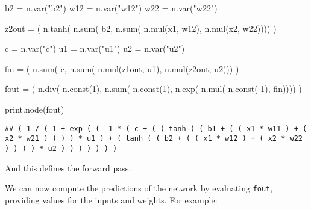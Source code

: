 \documentclass[
  a4paper,
]{article}
\newenvironment{Shaded}{\begin{snugshade}}{\end{snugshade}}
\newcommand{\DecValTok}[1]{\textcolor[rgb]{0.00,0.00,0.81}{#1}}
\newcommand{\FunctionTok}[1]{\textcolor[rgb]{0.00,0.00,0.00}{#1}}
\newcommand{\NormalTok}[1]{#1}
\newcommand{\OtherTok}[1]{\textcolor[rgb]{0.56,0.35,0.01}{#1}}
\newcommand{\SpecialCharTok}[1]{\textcolor[rgb]{0.00,0.00,0.00}{#1}}
\newcommand{\StringTok}[1]{\textcolor[rgb]{0.31,0.60,0.02}{#1}}
\begin{document}
\begin{Shaded}
\begin{Highlighting}[]
\NormalTok{b2 }\OtherTok{=} \FunctionTok{n.var}\NormalTok{(}\StringTok{"b2"}\NormalTok{)}
\NormalTok{w12 }\OtherTok{=} \FunctionTok{n.var}\NormalTok{(}\StringTok{"w12"}\NormalTok{)}
\NormalTok{w22 }\OtherTok{=} \FunctionTok{n.var}\NormalTok{(}\StringTok{"w22"}\NormalTok{)}

\NormalTok{z2out }\OtherTok{=}\NormalTok{ (}
  \FunctionTok{n.tanh}\NormalTok{(}
    \FunctionTok{n.sum}\NormalTok{(}
\NormalTok{      b2,}
      \FunctionTok{n.sum}\NormalTok{(}
         \FunctionTok{n.mul}\NormalTok{(x1, w12),}
         \FunctionTok{n.mul}\NormalTok{(x2, w22))))}
\NormalTok{)}

\NormalTok{c }\OtherTok{=} \FunctionTok{n.var}\NormalTok{(}\StringTok{"c"}\NormalTok{)}
\NormalTok{u1 }\OtherTok{=} \FunctionTok{n.var}\NormalTok{(}\StringTok{"u1"}\NormalTok{)}
\NormalTok{u2 }\OtherTok{=} \FunctionTok{n.var}\NormalTok{(}\StringTok{"u2"}\NormalTok{)}

\NormalTok{fin }\OtherTok{=}\NormalTok{ (}
  \FunctionTok{n.sum}\NormalTok{(}
\NormalTok{    c,}
    \FunctionTok{n.sum}\NormalTok{(}
      \FunctionTok{n.mul}\NormalTok{(z1out, u1),}
      \FunctionTok{n.mul}\NormalTok{(z2out, u2)))}
\NormalTok{)}

\NormalTok{fout }\OtherTok{=}\NormalTok{ (}
  \FunctionTok{n.div}\NormalTok{(}
     \FunctionTok{n.const}\NormalTok{(}\DecValTok{1}\NormalTok{),}
     \FunctionTok{n.sum}\NormalTok{(}
        \FunctionTok{n.const}\NormalTok{(}\DecValTok{1}\NormalTok{),}
        \FunctionTok{n.exp}\NormalTok{(}
           \FunctionTok{n.mul}\NormalTok{(}
              \FunctionTok{n.const}\NormalTok{(}\SpecialCharTok{{-}}\DecValTok{1}\NormalTok{),}
\NormalTok{              fin))))}
\NormalTok{)}

\FunctionTok{print.node}\NormalTok{(fout)}
\end{Highlighting}
\end{Shaded}

\begin{verbatim}
## ( 1 / ( 1 + exp ( ( -1 * ( c + ( ( tanh ( ( b1 + ( ( x1 * w11 ) + ( x2 * w21 ) ) ) ) * u1 ) + ( tanh ( ( b2 + ( ( x1 * w12 ) + ( x2 * w22 ) ) ) ) * u2 ) ) ) ) ) ) )
\end{verbatim}

And this defines the forward pass.

We can now compute the predictions of the network by evaluating
\texttt{fout}, providing values for the inputs and weights. For example:
\end{document}
